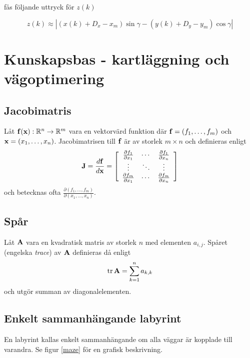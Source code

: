 \documentclass[11pt]{article}
\newcommand{\bfr}[1]{\textbf{\textrm{{#1}}}}
\begin{document}
\begin{flushleft}
fås följande uttryck för $z(k)$

\begin{equation}
	z(k) \approx |(x(k) + D_x - x_m) \sin \gamma - (y(k) + D_y - y_m) \cos \gamma |
\end{equation}

\section{Kunskapsbas - kartläggning och vägoptimering}
\subsection{Jacobimatris}
Låt $\bfr{f}(\bfr{x}):\mathbb{R}^{n}\rightarrow\mathbb{R}^{m}$ vara en vektorvärd funktion där $\bfr{f}=\left(f_1,\ldots,f_m\right)$ och $\bfr{x}=\left(x_1,\ldots,x_n\right)$. Jacobimatrisen till $\bfr{f}$ är av storlek $m\times n$ och definieras enligt
\begin{equation*}
	\bfr{J} = \frac{d\bfr{f}}{d\bfr{x}} = \left[ \begin{array}{ccc}
		\frac{\partial f_1}{\partial x_1} & \cdots & \frac{\partial f_1}{\partial x_n} \\
		\vdots & \ddots & \vdots \\
		\frac{\partial f_m}{\partial x_1} & \cdots & \frac{\partial f_m}{\partial x_n}
	\end{array} \right]
\end{equation*}
och betecknas ofta $\frac{\partial \left(f_1,\ldots,f_m\right)}{\partial \left(x_1,\ldots,x_n \right)}$.

\subsection{Spår}
Låt $\bfr{A}$ vara en kvadratisk matris av storlek $n$ med elementen $a_{i,j}$. Spåret (engelska \emph{trace}) av $\bfr{A}$ definieras då enligt
\begin{equation*}
	\mathrm{tr}\,\bfr{A} = \sum_{k=1}^{n} a_{k,k}
\end{equation*}
och utgör summan av diagonalelementen.

\subsection{Enkelt sammanhängande labyrint}
En labyrint kallas enkelt sammanhängande om alla väggar är kopplade till varandra. Se figur \ref{maze} för en grafisk beskrivning.


\end{flushleft}
\end{document}
